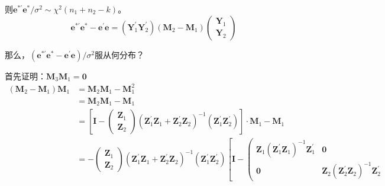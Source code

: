		则$ \boldsymbol{e}^{*\prime} \boldsymbol{e}^{*}/\sigma^{2} \sim \chi^{2}\left(n_{1}+n_{2}-k\right) $。
		$$ \boldsymbol{e}^{* \prime} \boldsymbol{e}^{*}-\boldsymbol{e}^{\prime} \boldsymbol{e}=\left(\boldsymbol{Y}_{1}^{\prime} \boldsymbol{Y}_{2}^{\prime}\right)\left(\boldsymbol{M}_{2}-\boldsymbol{M}_{1}\right)\left(\begin{array}{l}
			\boldsymbol{Y}_{1} \\
			\boldsymbol{Y}_{2}
		\end{array}\right) $$
	
		那么，$ \left ( \boldsymbol{e}^{* \prime} \boldsymbol{e}^{*}-\boldsymbol{e}^{\prime} \boldsymbol{e} \right ) /\sigma^{2} $服从何分布？
		
		\begin{myproof}
			首先证明：$ \boldsymbol{M}_{3} \boldsymbol{M}_{1}=\boldsymbol{0} $
			\begin{equation*}
				\begin{aligned}
					\left(\boldsymbol{M}_{2}-\boldsymbol{M}_{1}\right) \boldsymbol{M}_{1} 
					& = \boldsymbol{M}_{2} \boldsymbol{M}_{1}-\boldsymbol{M}_{1}^{2} \\
					& = \boldsymbol{M}_{2} \boldsymbol{M}_{1}-\boldsymbol{M}_{1} \\
					& = \left[ \boldsymbol{I}-
							\left(\begin{array}{c}
								\boldsymbol{Z}_{1} \\
								\boldsymbol{Z}_{2}
							\end{array}\right)
							\left(\boldsymbol{Z}_{1}^{\prime} \boldsymbol{Z}_{1}+\boldsymbol{Z}_{2}^{\prime} \boldsymbol{Z}_{2}\right)^{-1}
							\left(\boldsymbol{Z}_{1}^{\prime} \boldsymbol{Z}_{2}^{\prime}\right) 
						\right] 
					\cdot \boldsymbol{M}_{1}-\boldsymbol{M}_{1} \\
					& = -\left(\begin{array}{c}
						\boldsymbol{Z}_{1} \\
						\boldsymbol{Z}_{2}
					\end{array}\right)
					\left(\boldsymbol{Z}_{1}^{\prime} \boldsymbol{Z}_{1}+\boldsymbol{Z}_{2}^{\prime} \boldsymbol{Z}_{2}\right)^{-1}
					\left(\boldsymbol{Z}_{1}^{\prime} \boldsymbol{Z}_{2}^{\prime}\right)
					\left[ \boldsymbol{I}-
						\left(\begin{array}{cc}
							\boldsymbol{Z}_{1}\left(\boldsymbol{Z}_{1}^{\prime} \boldsymbol{Z}_{1}\right)^{-1} \boldsymbol{Z}_{1}^{\prime} & \boldsymbol{0} \\
							\boldsymbol{0} & \boldsymbol{Z}_{2}\left(\boldsymbol{Z}_{2}^{\prime} \boldsymbol{Z}_{2}\right)^{-1} \boldsymbol{Z}_{2}^{\prime}

\end{array}
\end{aligned}
\end{equation*}
\end{myproof}
